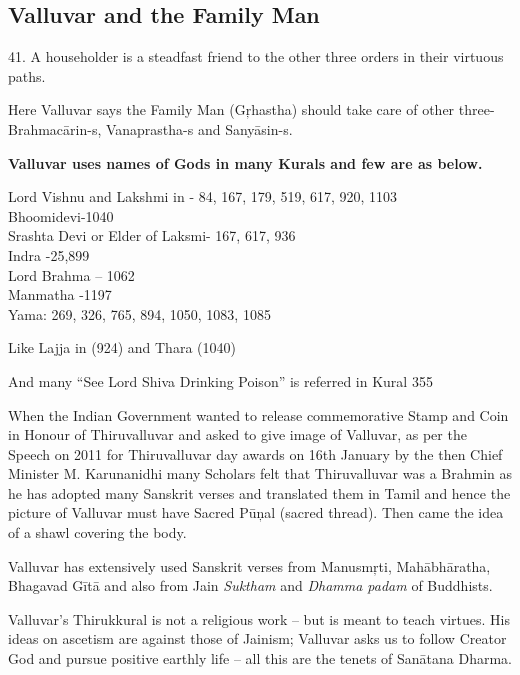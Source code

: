 \subsection*{Valluvar and the Family Man}

41. A householder is a steadfast friend to the other three orders in their virtuous paths.

Here Valluvar says the Family Man (Gŗhastha) should take care of other three- Brahmacārin-s, Vanaprastha-s and Sanyāsin-s.

\textbf{Valluvar uses names of Gods in many Kurals and few are as below.}

Lord Vishnu and Lakshmi in - 84, 167, 179, 519, 617, 920, 1103\\ Bhoomidevi-1040\\ Srashta Devi or Elder of Laksmi- 167, 617, 936\\ Indra -25,899\\ Lord Brahma – 1062\\ Manmatha -1197\\ Yama: 269, 326, 765, 894, 1050, 1083, 1085

Like Lajja in  (924) and Thara  (1040)

And many “See Lord Shiva Drinking Poison” is referred in Kural 355

When the Indian Government wanted to release commemorative Stamp and Coin in Honour of Thiruvalluvar and asked to give image of Valluvar, as per the Speech on 2011 for Thiruvalluvar day awards on 16th January by the then Chief Minister M. Karunanidhi many Scholars felt that Thiruvalluvar was a Brahmin as he has adopted many Sanskrit verses and translated them in Tamil and hence the picture of Valluvar must have Sacred Pūņal (sacred thread). Then came the idea of a shawl covering the body.

Valluvar has extensively used Sanskrit verses from Manusmŗti, Mahābhāratha, Bhagavad Gītā and also from Jain \textit{Suktham} and \textit{Dhamma padam} of Buddhists.

Valluvar’s Thirukkural is not a religious work – but is meant to teach virtues. His ideas on ascetism are against those of Jainism; Valluvar asks us to follow Creator God and pursue positive earthly life -- all this are the tenets of Sanātana Dharma.

\newpage

\theendnotes

